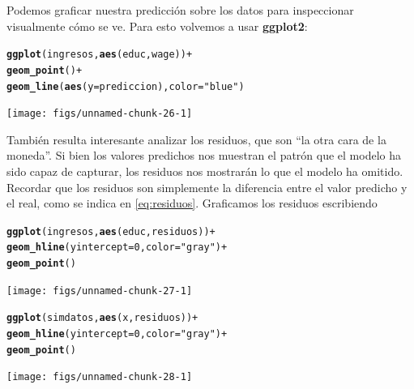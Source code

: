 \documentclass{article}\usepackage[]{graphicx}\usepackage[]{color}
\makeatletter
\newcommand{\hlnum}[1]{\textcolor[rgb]{0.686,0.059,0.569}{#1}}%
\newcommand{\hlstr}[1]{\textcolor[rgb]{0.192,0.494,0.8}{#1}}%
\newcommand{\hlopt}[1]{\textcolor[rgb]{0,0,0}{#1}}%
\newcommand{\hlstd}[1]{\textcolor[rgb]{0.345,0.345,0.345}{#1}}%
\newcommand{\hlkwc}[1]{\textcolor[rgb]{0.333,0.667,0.333}{#1}}%
\newcommand{\hlkwd}[1]{\textcolor[rgb]{0.737,0.353,0.396}{\textbf{#1}}}%
\newenvironment{kframe}{%
 \def\at@end@of@kframe{}%
 \ifinner\ifhmode%
  \def\at@end@of@kframe{\end{minipage}}%
  \begin{minipage}{\columnwidth}%
 \fi\fi%
 \def\FrameCommand##1{\hskip\@totalleftmargin \hskip-\fboxsep
 \colorbox{shadecolor}{##1}\hskip-\fboxsep
     \hskip-\linewidth \hskip-\@totalleftmargin \hskip\columnwidth}%
 \MakeFramed {\advance\hsize-\width
   \@totalleftmargin\z@ \linewidth\hsize
   \@setminipage}}%
 {\par\unskip\endMakeFramed%
 \at@end@of@kframe}
\newenvironment{knitrout}{}{} %
\newcommand*{\paq}[1]{\textbf{#1}}
\makeatother
\begin{document}
Podemos graficar nuestra predicción sobre los datos para inspeccionar visualmente cómo se ve. Para esto volvemos a usar \paq{ggplot2}:
\begin{knitrout}
\color{fgcolor}\begin{kframe}
\begin{alltt}
\hlkwd{ggplot}\hlstd{(ingresos,} \hlkwd{aes}\hlstd{(educ, wage))} \hlopt{+}
  \hlkwd{geom_point}\hlstd{()} \hlopt{+}
  \hlkwd{geom_line}\hlstd{(}\hlkwd{aes}\hlstd{(}\hlkwc{y} \hlstd{= prediccion),} \hlkwc{color} \hlstd{=} \hlstr{"blue"}\hlstd{)}
\end{alltt}
\end{kframe}

{\centering \texttt{[image: figs/unnamed-chunk-26-1]} 

}



\end{knitrout}

También resulta interesante analizar los residuos, que son ``la otra cara de la moneda''. Si bien los valores predichos nos muestran el patrón que el modelo ha sido capaz de capturar, los residuos nos mostrarán lo que el modelo ha omitido. Recordar que los residuos son simplemente la diferencia entre el valor predicho y el real, como se indica en \eqref{eq:residuos}. Graficamos los residuos escribiendo

\begin{knitrout}
\color{fgcolor}\begin{kframe}
\begin{alltt}
\hlkwd{ggplot}\hlstd{(ingresos,} \hlkwd{aes}\hlstd{(educ, residuos))} \hlopt{+}
  \hlkwd{geom_hline}\hlstd{(}\hlkwc{yintercept} \hlstd{=} \hlnum{0}\hlstd{,} \hlkwc{color} \hlstd{=} \hlstr{"gray"}\hlstd{)} \hlopt{+}
  \hlkwd{geom_point}\hlstd{()}
\end{alltt}
\end{kframe}

{\centering \texttt{[image: figs/unnamed-chunk-27-1]} 

}



\end{knitrout}

\begin{knitrout}
\color{fgcolor}\begin{kframe}
\begin{alltt}
\hlkwd{ggplot}\hlstd{(simdatos,} \hlkwd{aes}\hlstd{(x, residuos))} \hlopt{+}
  \hlkwd{geom_hline}\hlstd{(}\hlkwc{yintercept} \hlstd{=} \hlnum{0}\hlstd{,} \hlkwc{color} \hlstd{=} \hlstr{"gray"}\hlstd{)} \hlopt{+}
  \hlkwd{geom_point}\hlstd{()}
\end{alltt}
\end{kframe}

{\centering \texttt{[image: figs/unnamed-chunk-28-1]} 

}



\end{knitrout}
\end{document}
